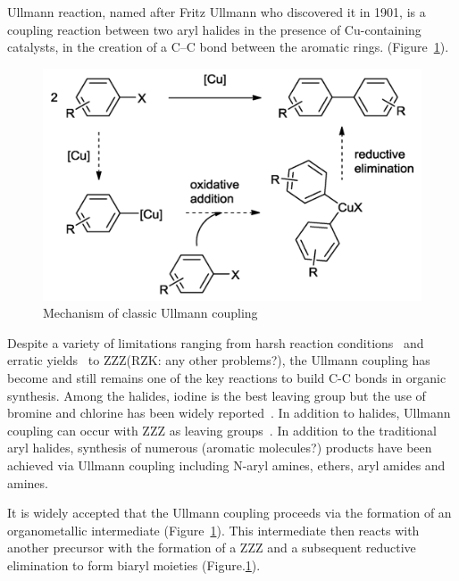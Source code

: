 \documentclass[journal=jacsat,manuscript=article]{achemso}
\begin{document}
Ullmann reaction, named after Fritz Ullmann who discovered it in 1901, is a coupling reaction between two aryl halides in the presence of Cu-containing catalysts, in the creation of a C--C bond between the aromatic rings.  (Figure~\ref{fig:classical}). 
%
\begin{figure}[ht]
\centering
\includegraphics[scale=0.6]{Fig/Figure1-mechanism.png}
\caption{Mechanism of classic Ullmann coupling}
\label{fig:classical}
\end{figure}
%
Despite a variety of limitations ranging from harsh reaction conditions~\cite{RZK} and erratic yields~\cite{RZK} to ZZZ(RZK: any other problems?), the Ullmann coupling has become and still remains one of the key reactions to build C-C bonds in organic synthesis. 
Among the halides, iodine is the best leaving group but the use of bromine and chlorine has been widely reported~\cite{RZK}. 
In addition to halides, Ullmann coupling can occur with ZZZ as leaving groups~\cite{RZK}. 
In addition to the traditional aryl halides, synthesis of numerous (aromatic molecules?) {products} have been achieved via Ullmann coupling including N-aryl amines, ethers, aryl amides and amines. %

It is widely accepted that the Ullmann coupling proceeds via the formation of an organometallic intermediate (Figure~\ref{fig:classical}). 
This intermediate then reacts with another precursor with the formation of a ZZZ and a subsequent reductive elimination to form biaryl moieties (Figure.\ref{fig:classical}). 
\end{document}
